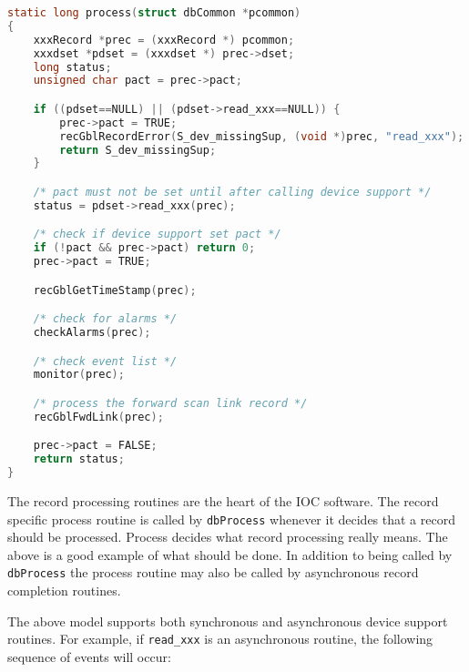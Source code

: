 \begin{lstlisting}[language=C]
static long process(struct dbCommon *pcommon)
{
    xxxRecord *prec = (xxxRecord *) pcommon;
    xxxdset *pdset = (xxxdset *) prec->dset;
    long status;
    unsigned char pact = prec->pact;

    if ((pdset==NULL) || (pdset->read_xxx==NULL)) {
        prec->pact = TRUE;
        recGblRecordError(S_dev_missingSup, (void *)prec, "read_xxx");
        return S_dev_missingSup;
    }

    /* pact must not be set until after calling device support */
    status = pdset->read_xxx(prec);

    /* check if device support set pact */
    if (!pact && prec->pact) return 0;
    prec->pact = TRUE;

    recGblGetTimeStamp(prec);

    /* check for alarms */
    checkAlarms(prec);

    /* check event list */
    monitor(prec);

    /* process the forward scan link record */
    recGblFwdLink(prec);

    prec->pact = FALSE;
    return status;
}
\end{lstlisting}

The record processing routines are the heart of the IOC software.
The record specific process routine is called by \verb|dbProcess| whenever it decides that a record should be processed.
Process decides what record processing really means.
The above is a good example of what should be done.
In addition to being called by \verb|dbProcess| the process routine may also be called by asynchronous record completion routines.

The above model supports both synchronous and asynchronous device support routines.
For example, if \verb|read_xxx| is an asynchronous routine, the following sequence of events will occur:

